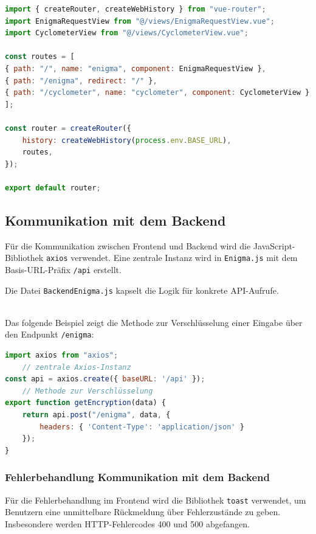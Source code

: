 \documentclass[12pt, ngerman, a4paper, numbers=noenddot]{article}
\begin{document}
\begin{lstlisting}[language=JavaScript, caption=Vue Router Konfiguration]
import { createRouter, createWebHistory } from "vue-router";
import EnigmaRequestView from "@/views/EnigmaRequestView.vue";
import CyclometerView from "@/views/CyclometerView.vue";

const routes = [
{ path: "/", name: "enigma", component: EnigmaRequestView },
{ path: "/enigma", redirect: "/" },
{ path: "/cyclometer", name: "cyclometer", component: CyclometerView },
];

const router = createRouter({
	history: createWebHistory(process.env.BASE_URL),
	routes,
});

export default router;
\end{lstlisting}


\subsection{Kommunikation mit dem Backend}

Für die Kommunikation zwischen Frontend und Backend wird die JavaScript-Bibliothek \lstinline|axios| verwendet. Eine zentrale Instanz wird in \lstinline|Enigma.js| mit dem Basis-URL-Präfix \lstinline|/api| erstellt.

Die Datei \lstinline|BackendEnigma.js| kapselt die Logik für konkrete API-Aufrufe.

\ \\
Das folgende Beispiel zeigt die Methode zur Verschlüsselung einer Eingabe über den Endpunkt \lstinline|/enigma|:

\begin{lstlisting}[language=JavaScript, caption=API-Aufruf in \texttt{BackendEnigma.js}]
import axios from "axios";
	// zentrale Axios-Instanz
const api = axios.create({ baseURL: '/api' });
	// Methode zur Verschlüsselung
export function getEncryption(data) {
	return api.post("/enigma", data, {
		headers: { 'Content-Type': 'application/json' }
	});
}
\end{lstlisting}

\newpage
\subsubsection{Fehlerbehandlung Kommunikation mit dem Backend}

Für die Fehlerbehandlung im Frontend wird die Bibliothek \lstinline|toast| verwendet, um Benutzern eine unmittelbare Rückmeldung über Fehlerzustände zu geben. Insbesondere werden HTTP-Fehlercodes 400 und 500 abgefangen. 
\end{document}
